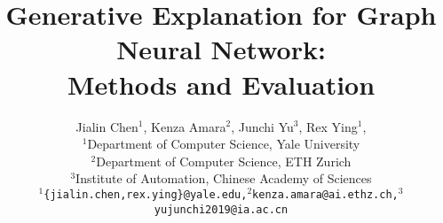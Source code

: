 \documentclass[11pt]{article}
\begin{document}
\title{Generative Explanation for Graph Neural Network: \\Methods and Evaluation}


\author
{Jialin Chen$^1$, Kenza Amara$^2$, Junchi Yu$^3$, Rex Ying$^1$, \\ 
\small{$^1$Department of Computer Science, Yale University} \\
\small{$^2$Department of Computer Science, ETH Zurich} \\
\small{$^3$Institute of Automation, Chinese Academy of Sciences}\\
\small\texttt{$^1$\{jialin.chen,rex.ying\}@yale.edu,$^2$kenza.amara@ai.ethz.ch,$^3$yujunchi2019@ia.ac.cn}
}



\maketitle
\renewcommand\thesection{\arabic{section}}
\setcounter{section}{0}
\setcounter{figure}{0}
\setcounter{table}{0}






% 





{
\small


}



\end{document}
